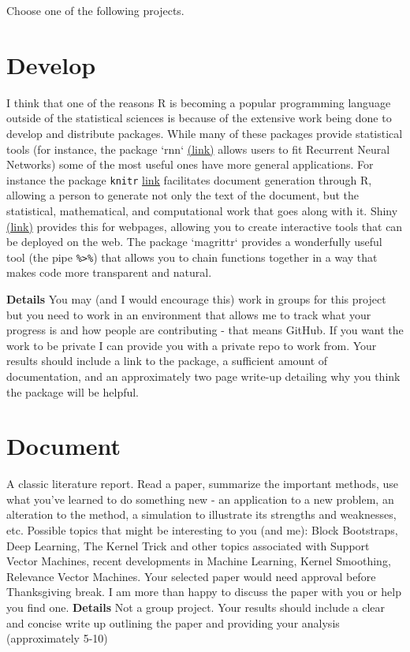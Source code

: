\documentclass[11pt]{article}
\begin{document}
\pagestyle{fancy} 

Choose one of the following projects. 

\section{Develop}

I think that one of the reasons R is becoming a popular programming language outside of the statistical sciences is because of the extensive work being done to develop and distribute packages. 
While many of these packages provide statistical tools (for instance, the package `rnn` \href{https://cran.r-project.org/web/packages/rnn/rnn.pdf}{(link)} allows users to fit Recurrent Neural Networks)
some of the most useful ones have more general applications. 
For instance the package \verb!knitr! \href{https://github.com/yihui/knitr/tree/master/R}{link} facilitates document generation through R, allowing a person to generate not only the text of the document, but the statistical, mathematical, and computational work that goes along with it.
Shiny \href{https://shiny.rstudio.com/}{(link)} provides this for webpages, allowing you to create interactive tools that can be deployed on the web.
The package `magrittr` provides a wonderfully useful tool (the pipe \verb!%>%!) that allows you to chain functions together in a way that makes code more transparent and natural.

\textbf{Details} You may (and I would encourage this) work in groups for this project but you need to work in an environment that allows me to track what your progress is and how people are contributing - that means GitHub. If you want the work to be private I can provide you with a private repo to work from. Your results should include a link to the package, a sufficient amount of documentation, and an approximately two page write-up detailing why you think the package will be helpful.

\section{Document}

A classic literature report. Read a paper, summarize the important methods, use what you've learned to do something new - an application to a new problem, an alteration to the method, a simulation to illustrate its strengths and weaknesses, etc.
Possible topics that might be interesting to you (and me): Block Bootstraps, Deep Learning, The Kernel Trick and other topics associated with Support Vector Machines, recent developments in Machine Learning, Kernel Smoothing, Relevance Vector Machines.
Your selected paper would need approval before Thanksgiving break. I am more than happy to discuss the paper with you or help you find one.
\textbf{Details} Not a group project. Your results should include a clear and concise write up outlining the paper and providing your analysis (approximately 5-10)
\end{document}
